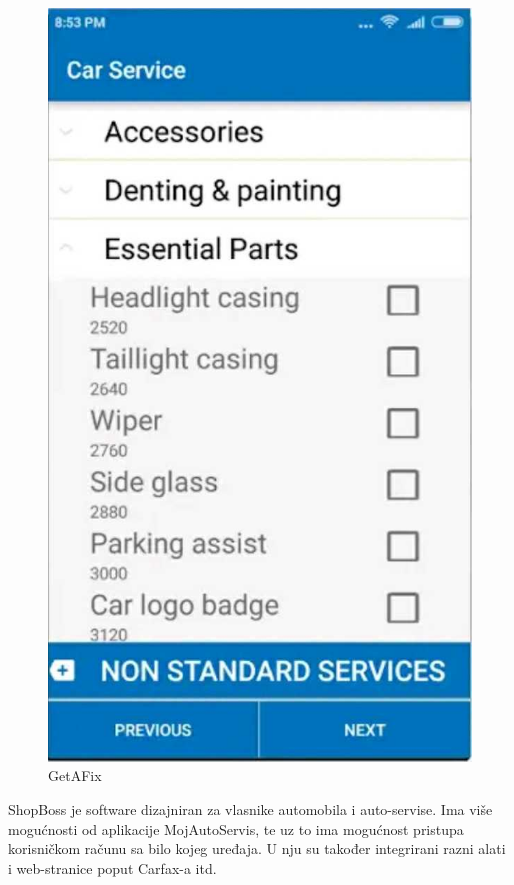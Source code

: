 		\begin{figure}[H]
			\includegraphics[scale=0.2]{slike/getafix.JPG}
			\centering
			\caption{GetAFix}
			\label{fig:idk}
		\end{figure}  
		
		ShopBoss je software dizajniran za vlasnike automobila i auto-servise. Ima više mogućnosti od aplikacije MojAutoServis, te uz to ima mogućnost pristupa korisničkom računu sa bilo kojeg uređaja. U nju su također integrirani razni alati i web-stranice poput Carfax-a itd.
		
